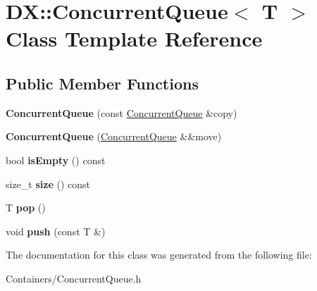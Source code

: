 \hypertarget{class_d_x_1_1_concurrent_queue}{\section{D\-X\-:\-:Concurrent\-Queue$<$ T $>$ Class Template Reference}
\label{class_d_x_1_1_concurrent_queue}
}
\subsection*{Public Member Functions}
\begin{DoxyCompactItemize}
\item 
\hypertarget{class_d_x_1_1_concurrent_queue_a53b572618eefcd822c5f480df1ff0a68}{{\bfseries Concurrent\-Queue} (const \hyperlink{class_d_x_1_1_concurrent_queue}{Concurrent\-Queue} \&copy)}\label{class_d_x_1_1_concurrent_queue_a53b572618eefcd822c5f480df1ff0a68}

\item 
\hypertarget{class_d_x_1_1_concurrent_queue_a97410a1d0d3a36f5ee9715ba39929f01}{{\bfseries Concurrent\-Queue} (\hyperlink{class_d_x_1_1_concurrent_queue}{Concurrent\-Queue} \&\&move)}\label{class_d_x_1_1_concurrent_queue_a97410a1d0d3a36f5ee9715ba39929f01}

\item 
\hypertarget{class_d_x_1_1_concurrent_queue_a471ad014f5c7bbcc7564792be3738e74}{bool {\bfseries is\-Empty} () const }\label{class_d_x_1_1_concurrent_queue_a471ad014f5c7bbcc7564792be3738e74}

\item 
\hypertarget{class_d_x_1_1_concurrent_queue_a8bceba6b265016871335a98ce3985cfb}{size\-\_\-t {\bfseries size} () const }\label{class_d_x_1_1_concurrent_queue_a8bceba6b265016871335a98ce3985cfb}

\item 
\hypertarget{class_d_x_1_1_concurrent_queue_a3506ef7d7ea9b5619818aa8fce507087}{T {\bfseries pop} ()}\label{class_d_x_1_1_concurrent_queue_a3506ef7d7ea9b5619818aa8fce507087}

\item 
\hypertarget{class_d_x_1_1_concurrent_queue_aacd4c07e131e1d562c74fa0d23289ea5}{void {\bfseries push} (const T \&)}\label{class_d_x_1_1_concurrent_queue_aacd4c07e131e1d562c74fa0d23289ea5}

\end{DoxyCompactItemize}


The documentation for this class was generated from the following file\-:\begin{DoxyCompactItemize}
\item 
Containers/Concurrent\-Queue.\-h\end{DoxyCompactItemize}
